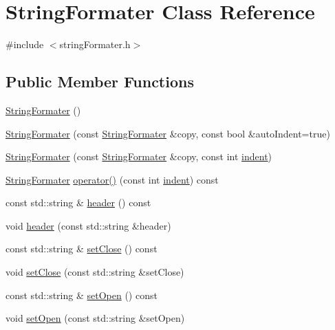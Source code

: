 \hypertarget{classStringFormater}{}\section{String\+Formater Class Reference}
\label{classStringFormater}


{\ttfamily \#include $<$string\+Formater.\+h$>$}

\subsection*{Public Member Functions}
\begin{DoxyCompactItemize}
\item 
\hyperlink{classStringFormater_abb1d26793e735b96a408f956daa43361}{String\+Formater} ()
\item 
\hyperlink{classStringFormater_a91a7cfa34811723d7b934c1d22def6a8}{String\+Formater} (const \hyperlink{classStringFormater}{String\+Formater} \&copy, const bool \&auto\+Indent=true)
\item 
\hyperlink{classStringFormater_a9fd21580941b514287b9ec15ddc665ea}{String\+Formater} (const \hyperlink{classStringFormater}{String\+Formater} \&copy, const int \hyperlink{classStringFormater_a8a4422bdcbe498401aecb283c433d31d}{indent})
\item 
\hyperlink{classStringFormater}{String\+Formater} \hyperlink{classStringFormater_a0fe6b7b48c1660c4a009da745c05451c}{operator()} (const int \hyperlink{classStringFormater_a8a4422bdcbe498401aecb283c433d31d}{indent}) const
\item 
const std\+::string \& \hyperlink{classStringFormater_adebd3114b32c2aa5d1ebc1737a56ca5d}{header} () const
\item 
void \hyperlink{classStringFormater_ac8c0d32e4249aadbcfada138760ac944}{header} (const std\+::string \&header)
\item 
const std\+::string \& \hyperlink{classStringFormater_abe673b8b8b9a588f05a8e7de748189e7}{set\+Close} () const
\item 
void \hyperlink{classStringFormater_af8e955e219e2666e2072783bcfb54cc6}{set\+Close} (const std\+::string \&set\+Close)
\item 
const std\+::string \& \hyperlink{classStringFormater_a395cdce03292513a02a9622c920478b5}{set\+Open} () const
\item 
void \hyperlink{classStringFormater_a2b7df7412f7e0993532525aed90ca258}{set\+Open} (const std\+::string \&set\+Open)
\item 

\end{DoxyCompactItemize}
